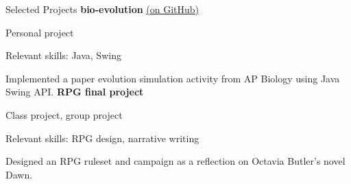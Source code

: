 \begin{rubric}{Selected Projects}
	\textbf{bio-evolution} \href{https://github.com/cephcyn/bio-evolution}{(on GitHub)}
	\par Personal project
	\par Relevant skills: Java, Swing
	\par Implemented a paper evolution simulation activity from AP Biology using Java Swing API.
\entry*[2017] %
	\textbf{RPG final project} %
	\par Class project, group project
	\par Relevant skills: RPG design, narrative writing
	\par Designed an RPG ruleset and campaign as a reflection on Octavia Butler's novel Dawn.
\end{rubric}